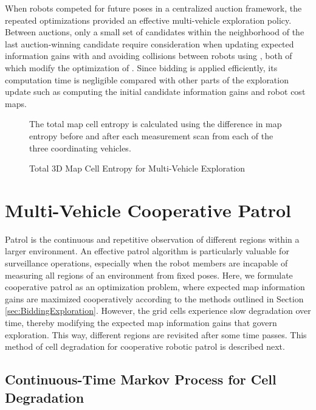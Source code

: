 When robots competed for future poses in a centralized auction framework, the repeated optimizations provided an effective multi-vehicle exploration policy. Between auctions, only a small set of candidates within the neighborhood of the last auction-winning candidate require consideration when updating expected information gains with  and avoiding collisions between robots using , both of which modify the optimization of . Since bidding is applied efficiently, its computation time is negligible compared with other parts of the exploration update such as computing the initial candidate information gains and robot cost maps.

	\begin{figure}
		\caption{Total 3D Map Cell Entropy for Multi-Vehicle Exploration}
		\medskip
		\small
		The total map cell entropy is calculated using the difference in map entropy before and after each measurement scan from each of the three coordinating vehicles.
		\label{fig:simH}
	\end{figure}





\section{Multi-Vehicle Cooperative Patrol}


Patrol is the continuous and repetitive observation of different regions within a larger environment. An effective patrol algorithm is particularly valuable for surveillance operations, especially when the robot members are incapable of measuring all regions of an environment from fixed poses. Here, we formulate cooperative patrol as an optimization problem, where expected map information gains are maximized cooperatively according to the methods outlined in Section \ref{sec:BiddingExploration}. However, the grid cells experience slow degradation over time, thereby modifying the expected map information gains that govern exploration. This way, different regions are revisited after some time passes. This method of cell degradation for cooperative robotic patrol is described next.

\subsection{Continuous-Time Markov Process for Cell Degradation}

